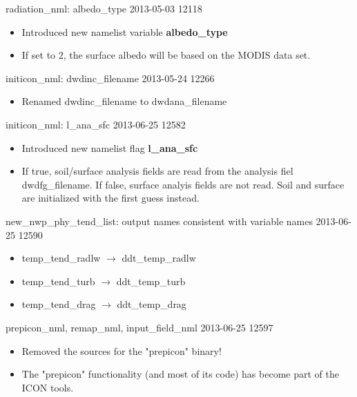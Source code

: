 \begin{changeitem}{radiation\_nml: albedo\_type}{ 2013-05-03 }{ 12118 }
  \begin{itemize}
   \item Introduced new namelist variable \textbf{albedo\_type}
   \item If set to $2$, the surface albedo will be based on the MODIS data set.
  \end{itemize}
\end{changeitem}

\begin{changeitem}{initicon\_nml: dwdinc\_filename}{ 2013-05-24 }{ 12266 }
  \begin{itemize}
   \item Renamed dwdinc\_filename to dwdana\_filename
  \end{itemize}
\end{changeitem}

\begin{changeitem}{initicon\_nml: l\_ana\_sfc}{ 2013-06-25 }{ 12582 }
  \begin{itemize}
   \item Introduced new namelist flag \textbf{l\_ana\_sfc}
   \item If true, soil/surface analysis fields are read from the analysis fiel dwdfg\_filename.
         If false, surface analyis fields are not read. Soil and surface are initialized with the first guess instead.
  \end{itemize}
\end{changeitem}

\begin{changeitem}{new\_nwp\_phy\_tend\_list: output names consistent with variable names}{ 2013-06-25 }{ 12590 }
  \begin{itemize}
   \item temp\_tend\_radlw $\rightarrow$ ddt\_temp\_radlw
   \item temp\_tend\_turb $\rightarrow$ ddt\_temp\_turb
   \item temp\_tend\_drag $\rightarrow$ ddt\_temp\_drag
  \end{itemize}
\end{changeitem}

\begin{changeitem}{prepicon\_nml, remap\_nml, input\_field\_nml}{ 2013-06-25 }{ 12597 }
  \begin{itemize}
   \item Removed the sources for the "prepicon" binary!
   \item The "prepicon" functionality (and most of its code) has become part of the ICON tools.
  \end{itemize}
\end{changeitem}

